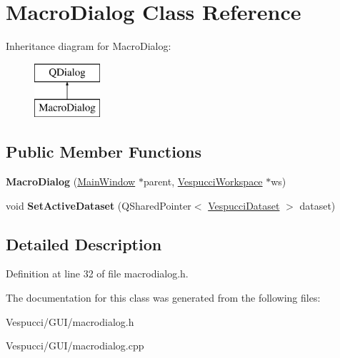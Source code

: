 \hypertarget{class_macro_dialog}{}\section{Macro\+Dialog Class Reference}
\label{class_macro_dialog}
Inheritance diagram for Macro\+Dialog\+:\begin{figure}[H]
\begin{center}
\leavevmode
\includegraphics[height=2.000000cm]{class_macro_dialog}
\end{center}
\end{figure}
\subsection*{Public Member Functions}
\begin{DoxyCompactItemize}
\item 
{\bfseries Macro\+Dialog} (\hyperlink{class_main_window}{Main\+Window} $\ast$parent, \hyperlink{class_vespucci_workspace}{Vespucci\+Workspace} $\ast$ws)\hypertarget{class_macro_dialog_a0b0fe1bf78931117107f3e4ed798d501}{}\label{class_macro_dialog_a0b0fe1bf78931117107f3e4ed798d501}

\item 
void {\bfseries Set\+Active\+Dataset} (Q\+Shared\+Pointer$<$ \hyperlink{class_vespucci_dataset}{Vespucci\+Dataset} $>$ dataset)\hypertarget{class_macro_dialog_a9ce87a0218177f83d1927e9554637bde}{}\label{class_macro_dialog_a9ce87a0218177f83d1927e9554637bde}

\end{DoxyCompactItemize}


\subsection{Detailed Description}


Definition at line 32 of file macrodialog.\+h.



The documentation for this class was generated from the following files\+:\begin{DoxyCompactItemize}
\item 
Vespucci/\+G\+U\+I/macrodialog.\+h\item 
Vespucci/\+G\+U\+I/macrodialog.\+cpp\end{DoxyCompactItemize}
